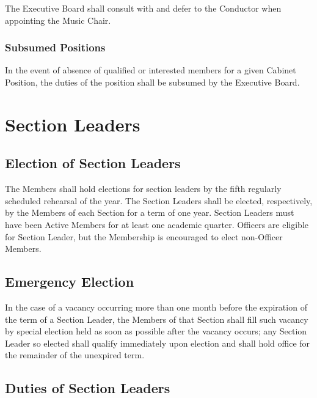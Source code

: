 \documentclass{article}
\begin{document}
The Executive Board shall consult with and defer to the Conductor when
appointing the Music Chair.

\subsubsection{Subsumed Positions}

In the event of absence of qualified or interested members for a given
Cabinet Position, the duties of the position shall be subsumed by
the Executive Board.

\section{Section Leaders}

\subsection{Election of Section Leaders}

The Members shall hold elections for section leaders by the fifth
regularly scheduled rehearsal of the year. The Section Leaders shall
be elected, respectively, by the Members of each Section for a term
of one year. Section Leaders must have been Active Members for at
least one academic quarter. Officers are eligible for Section Leader,
but the Membership is encouraged to elect non-Officer Members.

\subsection{Emergency Election}

In the case of a vacancy occurring more than one month before the
expiration of the term of a Section Leader, the Members of that Section
shall fill such vacancy by special election held as soon as possible
after the vacancy occurs; any Section Leader so elected shall qualify
immediately upon election and shall hold office for the remainder
of the unexpired term.

\subsection{Duties of Section Leaders}
\end{document}
